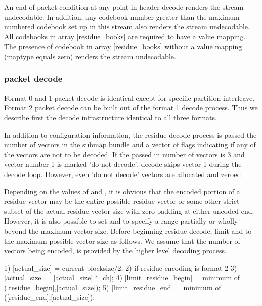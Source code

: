 An end-of-packet condition at any point in header decode renders the
stream undecodable.  In addition, any codebook number greater than the
maximum numbered codebook set up in this stream also renders the
stream undecodable. All codebooks in array [residue\_books] are
required to have a value mapping.  The presence of codebook in array
[residue\_books] without a value mapping (maptype equals zero) renders
the stream undecodable.



\subsubsection{packet decode}

Format 0 and 1 packet decode is identical except for specific
partition interleave.  Format 2 packet decode can be built out of the
format 1 decode process.  Thus we describe first the decode
infrastructure identical to all three formats.

In addition to configuration information, the residue decode process
is passed the number of vectors in the submap bundle and a vector of
flags indicating if any of the vectors are not to be decoded.  If the
passed in number of vectors is 3 and vector number 1 is marked 'do not
decode', decode skips vector 1 during the decode loop.  However, even
'do not decode' vectors are allocated and zeroed.

Depending on the values of  and
, it is obvious that the encoded
portion of a residue vector may be the entire possible residue vector
or some other strict subset of the actual residue vector size with
zero padding at either uncoded end.  However, it is also possible to
set  and
 to specify a range partially or
wholly beyond the maximum vector size.  Before beginning residue
decode, limit  and
 to the maximum possible vector size
as follows.  We assume that the number of vectors being encoded,
\varname{[ch]} is provided by the higher level decoding
process.

\begin{programlisting}
  1) [actual\_size] = current blocksize/2;
  2) if residue encoding is format 2
       3) [actual\_size] = [actual\_size] * [ch];
  4) [limit\_residue\_begin] = minimum of ([residue\_begin],[actual\_size]);
  5) [limit\_residue\_end] = minimum of ([residue\_end],[actual\_size]);
\end{programlisting}

